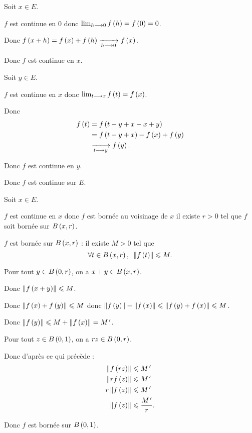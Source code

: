 \begin{dem}
Soit \(x\in E\).

\(f\) est continue en \(0\) donc \(\lim_{h\longrightarrow0}f\left(h\right)=f\left(0\right)=0\).

Donc \(f\left(x+h\right)=f\left(x\right)+f\left(h\right)\xrightarrow[h\longrightarrow0]{}f\left(x\right)\).

Donc \(f\) est continue en \(x\).
\end{dem}

\begin{dem}
Soit \(y\in E\).

\(f\) est continue en \(x\) donc \(\lim_{t\longrightarrow x}f\left(t\right)=f\left(x\right)\).

Donc \[\begin{aligned}
f\left(t\right)&=f\left(t-y+x-x+y\right) \\
&=f\left(t-y+x\right)-f\left(x\right)+f\left(y\right) \\
&\xrightarrow[t\longrightarrow y]{}f\left(y\right).
\end{aligned}\]

Donc \(f\) est continue en \(y\).

Donc \(f\) est continue sur \(E\).
\end{dem}

\begin{dem}
Soit \(x\in E\).

\(f\) est continue en \(x\) donc \(f\) est bornée au voisinage de \(x\) \ie il existe \(r>0\) tel que \(f\) soit bornée sur \(\bouleo{x}{r}\).
\end{dem}

\begin{dem}
\(f\) est bornée sur \(\bouleo{x}{r}\) : il existe \(M>0\) tel que \[\quantifs{\forall t\in\bouleo{x}{r}}\norme{f\paren{t}}\leq M.\]

Pour tout \(y\in\bouleo{0}{r}\), on a \(x+y\in\bouleo{x}{r}\).

Donc \(\norme{f\paren{x+y}}\leq M\).

Donc \(\norme{f\paren{x}+f\paren{y}}\leq M\) donc \(\norme{f\paren{y}}-\norme{f\paren{x}}\leq\norme{f\paren{y}+f\paren{x}}\leq M\).

Donc \(\norme{f\paren{y}}\leq M+\norme{f\paren{x}}=M\prim\).

Pour tout \(z\in\bouleo{0}{1}\), on a \(rz\in\bouleo{0}{r}\).

Donc d'après ce qui précède : \[\begin{aligned}
\norme{f\paren{rz}}&\leq M\prim \\
\norme{rf\paren{z}}&\leq M\prim \\
r\norme{f\paren{z}}&\leq M\prim \\
\norme{f\paren{z}}&\leq\dfrac{M\prim}{r}.
\end{aligned}\]

Donc \(f\) est bornée sur \(\bouleo{0}{1}\).
\end{dem}

